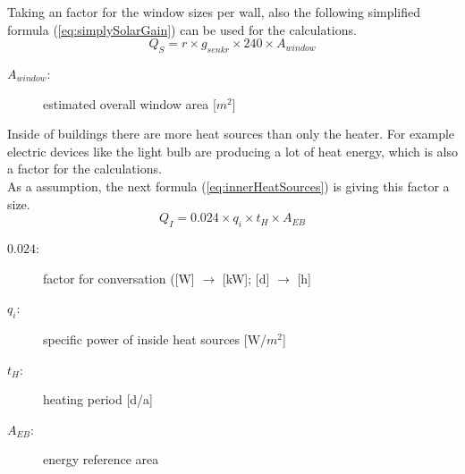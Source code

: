Taking an factor for the window sizes per wall, also the following simplified formula (\ref{eq:simplySolarGain}) can be used for the calculations.
\begin{equation}
Q_S = r \times g_{senkr} \times 240 \times A_{window} 
\label{eq:simplySolarGain}
\end{equation}
\begin{description}
\item[$A_{window} $:] estimated overall window area [$m^2$]
\end{description}
Inside of buildings there are more heat sources than only the heater. For example electric devices like the light bulb are producing a lot of heat energy, which is also a factor for the calculations.\\
As a assumption, the next formula (\ref{eq:innerHeatSources}) is giving this factor a size.
\begin{equation}
Q_I = 0.024 \times q_i \times t_H \times A_{EB} 
\label{eq:innerHeatSources}
\end{equation}
\begin{description}
\item[$0.024 $:] factor for conversation ([W] $\rightarrow$ [kW]; [d] $\rightarrow$ [h]
\item[$q_i $:] specific power of inside heat sources [W/$m^2$]
\item[$t_H $:] heating period [d/a]
\item[$A_{EB} $:] energy reference area
\end{description}

